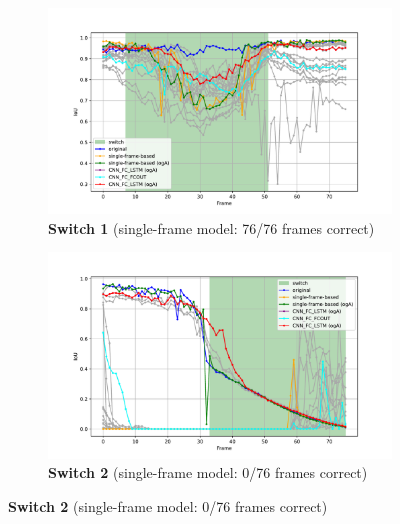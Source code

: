 \begin{figure}[H]
    \centering
    \begin{subfigure}[b]{0.49\textwidth}
        \centering
        \includegraphics[width=\textwidth]{PICs/experiments/temporalModels/plot_ious_sequence_4.pdf}
        \caption{\textbf{Switch 1} (single-frame model: 76/76 frames correct)}
        \label{fig:IoUTrends_switch_4}
    \end{subfigure}
    \begin{subfigure}[b]{0.49\textwidth}
        \centering
        \includegraphics[width=\textwidth]{PICs/experiments/temporalModels/plot_ious_sequence_2.pdf}
        \caption{\textbf{Switch 2} (single-frame model: 0/76 frames correct)}
        \label{fig:IoUTrends_switch_2}
    \end{subfigure}

    \vspace{0.2em} %


\end{figure}
